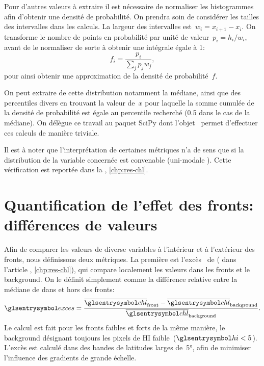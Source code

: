 Pour d'autres valeurs à extraire il est nécessaire de normaliser les histogrammes afin d'obtenir une densité de probabilité. On prendra soin de considérer les tailles des intervalles dans les calculs.
La largeur des intervalles est~\(w_i = x_{i+1}-x_i\). On transforme le nombre de points en probabilité par unité de valeur~\(p_i = h_i / w_i \), avant de le normaliser de sorte à obtenir une intégrale égale à 1:
\begin{equation}
  f_i = \frac{p_i} {\sum_j p_j w_j},
\end{equation}
pour ainsi obtenir une approximation de la densité de probabilité~\(f\).

On peut extraire de cette distribution notamment la médiane, ainsi que des percentiles divers en trouvant la valeur de~\(x\) pour laquelle la somme cumulée de la densité de probabilité est égale au percentile recherché (0.5 dans le cas de la médiane).
On délègue ce travail au paquet SciPy dont l'objet~ permet d'effectuer ces calculs de manière triviale.

Il est à noter que l'interprétation de certaines métriques n'a de sens que si la distribution de la variable concernée est convenable (uni-modale ).
Cette vérification est reportée dans la , \cref*{chp:res-chl}.

\section{Quantification de l'effet des fronts: différences de valeurs}
\label{sec:extraction-surplus-lag}

Afin de comparer les valeurs de diverse variables à l'intérieur et à l'extérieur des fronts, nous définissons deux métriques.
La première est l'excès~ de  ( dans l'article , \cref*{chp:res-chl}), qui compare localement les valeurs dans les fronts et le background. On le définit simplement comme la différence relative entre la médiane de  dans et hors des fronts:
\begin{equation}
  \am{exces} = \frac{\med{\am{chl}}_\frt - \med{\am{chl}}_\bkg}
  {\med{\am{chl}}_\bkg} .
\end{equation}
Le calcul est fait pour les fronts faibles et forts de la même manière, le background désignant toujours les pixels de HI faible~(\(\am{hi} < 5\)).
L'excès est calculé dans des bandes de latitudes larges de~\ang[mode=math]{5}, afin de minimiser l'influence des gradients de grande échelle.

